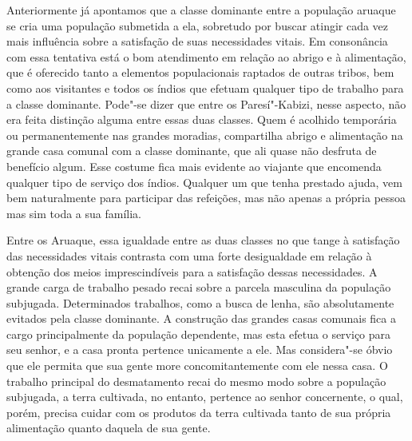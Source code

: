 Anteriormente já apontamos que a classe dominante entre a população
aruaque se cria uma população submetida a ela, sobretudo por buscar
atingir cada vez mais influência sobre a satisfação de suas necessidades
vitais. Em consonância com essa tentativa está o bom atendimento em
relação ao abrigo e à alimentação, que é oferecido tanto a elementos
populacionais raptados de outras tribos, bem como aos visitantes e todos
os índios que efetuam qualquer tipo de trabalho para a classe dominante.
Pode"-se dizer que entre os Paresí"-Kabizi, nesse aspecto, não era feita
distinção alguma entre essas duas classes. Quem é acolhido temporária ou
permanentemente nas grandes moradias, compartilha abrigo e alimentação
na grande casa comunal com a classe dominante, que ali quase não
desfruta de benefício algum. Esse costume fica mais evidente ao viajante
que encomenda qualquer tipo de serviço dos índios. Qualquer um que tenha
prestado ajuda, vem bem naturalmente para participar das refeições, mas
não apenas a própria pessoa mas sim toda a sua família.

Entre os Aruaque, essa igualdade entre as duas classes no que tange à
satisfação das necessidades vitais contrasta com uma forte desigualdade
em relação à obtenção dos meios imprescindíveis para a satisfação
dessas necessidades. A grande carga de trabalho pesado recai sobre a
parcela masculina da população subjugada. Determinados trabalhos, como a
busca de lenha, são absolutamente evitados pela classe dominante. A
construção das grandes casas comunais fica a cargo principalmente da
população dependente, mas esta efetua o serviço para seu senhor, e a
casa pronta pertence unicamente a ele. Mas considera"-se óbvio que ele
permita que sua gente more concomitantemente com ele nessa casa. O
trabalho principal do desmatamento recai do mesmo modo sobre a
população subjugada, a terra cultivada, no entanto, pertence ao senhor
concernente, o qual, porém, precisa cuidar com os produtos da terra
cultivada tanto de sua própria alimentação quanto daquela de sua gente.

